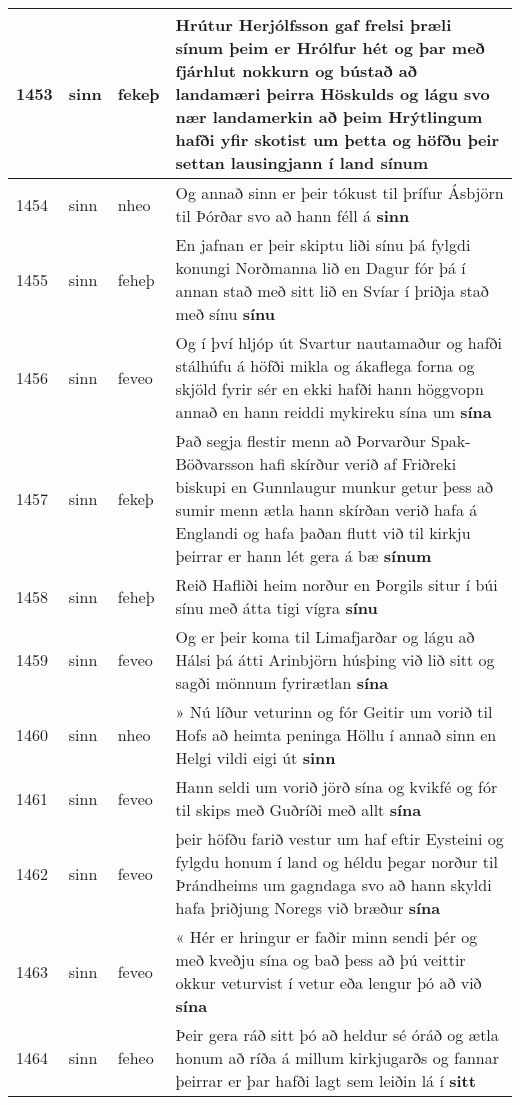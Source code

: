 \documentclass{article}
\begin{document}
\begin{longtable}{p{1cm}|p{1cm}|p{1cm}|p{13cm}}
\hline
1453&sinn&fekeþ&Hrútur Herjólfsson gaf frelsi þræli sínum þeim er Hrólfur hét og þar með fjárhlut nokkurn og bústað að landamæri þeirra Höskulds og lágu svo nær landamerkin að þeim Hrýtlingum hafði yfir skotist um þetta og höfðu þeir settan lausingjann í land \textbf{sínum} \\
\hline
1454&sinn&nheo&Og annað sinn er þeir tókust til þrífur Ásbjörn til Þórðar svo að hann féll á \textbf{sinn} \\
\hline
1455&sinn&feheþ&En jafnan er þeir skiptu liði sínu þá fylgdi konungi Norðmanna lið en Dagur fór þá í annan stað með sitt lið en Svíar í þriðja stað með sínu \textbf{sínu} \\
\hline
1456&sinn&feveo&Og í því hljóp út Svartur nautamaður og hafði stálhúfu á höfði mikla og ákaflega forna og skjöld fyrir sér en ekki hafði hann höggvopn annað en hann reiddi mykireku sína um \textbf{sína} \\
\hline
1457&sinn&fekeþ&Það segja flestir menn að Þorvarður Spak-Böðvarsson hafi skírður verið af Friðreki biskupi en Gunnlaugur munkur getur þess að sumir menn ætla hann skírðan verið hafa á Englandi og hafa þaðan flutt við til kirkju þeirrar er hann lét gera á bæ \textbf{sínum} \\
\hline
1458&sinn&feheþ&Reið Hafliði heim norður en Þorgils situr í búi sínu með átta tigi vígra \textbf{sínu} \\
\hline
1459&sinn&feveo&Og er þeir koma til Limafjarðar og lágu að Hálsi þá átti Arinbjörn húsþing við lið sitt og sagði mönnum fyrirætlan \textbf{sína} \\
\hline
1460&sinn&nheo&» Nú líður veturinn og fór Geitir um vorið til Hofs að heimta peninga Höllu í annað sinn en Helgi vildi eigi út \textbf{sinn} \\
\hline
1461&sinn&feveo&Hann seldi um vorið jörð sína og kvikfé og fór til skips með Guðríði með allt \textbf{sína} \\
\hline
1462&sinn&feveo&þeir höfðu farið vestur um haf eftir Eysteini og fylgdu honum í land og héldu þegar norður til Þrándheims um gagndaga svo að hann skyldi hafa þriðjung Noregs við bræður \textbf{sína} \\
\hline
1463&sinn&feveo&« Hér er hringur er faðir minn sendi þér og með kveðju sína og bað þess að þú veittir okkur veturvist í vetur eða lengur þó að við \textbf{sína} \\
\hline
1464&sinn&feheo&Þeir gera ráð sitt þó að heldur sé óráð og ætla honum að ríða á millum kirkjugarðs og fannar þeirrar er þar hafði lagt sem leiðin lá í \textbf{sitt} \\

\end{longtable}
\end{document}
